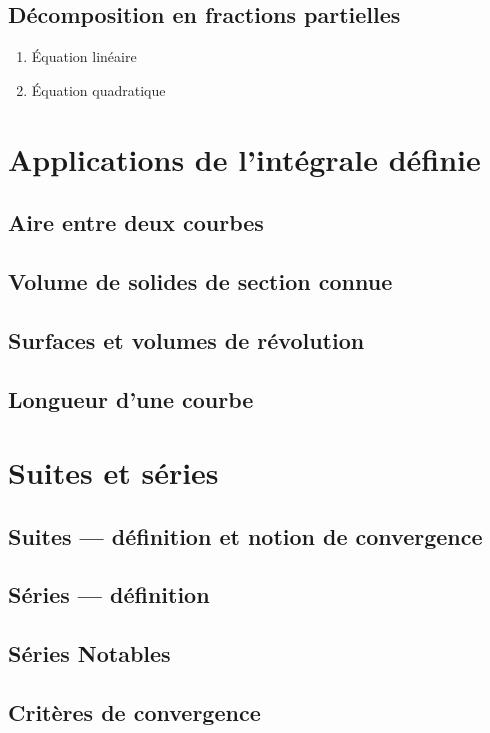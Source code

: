 \documentclass{article}
\begin{document}
\begin{remark}

\end{remark}

\subsection{Décomposition en fractions partielles}

\begin{enumerate}
    \item Équation linéaire
    \item Équation quadratique
\end{enumerate}

\section{Applications de l’intégrale définie}
\subsection{Aire entre deux courbes}
\subsection{Volume de solides de section connue}
\subsection{Surfaces et volumes de révolution}
\subsection{Longueur d’une courbe}
\section{Suites et séries}
\subsection{Suites — définition et notion de convergence}
\subsection{Séries — définition}
\subsection{Séries Notables}
\subsection{Critères de convergence}
\end{document}
